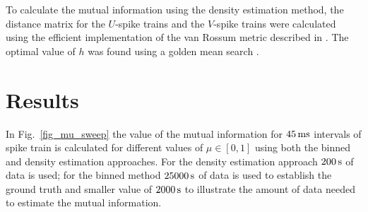 \documentclass[12pt]{article}
\newcommand{\ms}{\mbox{\,ms}}
\newcommand{\s}{\mbox{\,s}}
\begin{document}
To calculate the mutual information using the density estimation
method, the distance matrix for the $U$-spike trains and the $V$-spike
trains were calculated using the efficient implementation of the van
Rossum metric described in \citep{HoughtonKreuz2012}. The optimal
value of $h$ was found using a golden mean search \citep{Kiefer1953}.

\section{Results}

In Fig.~\ref{fig_mu_sweep} the value of the mutual information for
$45\ms$ intervals of spike train is calculated for different values of
$\mu\in[0,1]$ using both the binned and density estimation approaches. For the density estimation
  approach $200\s$ of data is used; for the binned method
  $25000\s$ of data is used to establish the ground truth and smaller
  value of $2000\s$ to illustrate the amount of data needed to
  estimate the mutual information.
\end{document}
